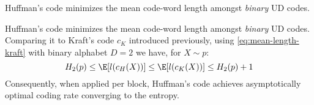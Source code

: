 \documentclass[toc]{../cs-classes/cs-classes}
\begin{document}
\begin{lemma}
    \label{lem:optimal-binary-code}
    Huffman's code minimizes the mean code-word length amongst \emph{binary} UD codes.
\end{lemma}

\begin{remark}
    Huffman's code minimizes the mean code-word length amongst \emph{binary} UD codes. Comparing it to Kraft's code $c_K$ introduced previously, using \eqref{eq:mean-length-kraft} with binary alphabet $D=2$ we have, for $X\sim p$:
    \begin{equation}
        H_2(p)\leq\E[l(c_H(X))]\leq\E[l(c_K(X))]\leq H_2(p)+1
    \end{equation}
    Consequently, when applied per block, Huffman's code achieves asymptotically optimal coding rate converging to the entropy.
\end{remark}
\end{document}
